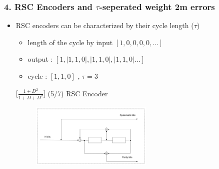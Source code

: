 \documentclass{beamer}  %
\begin{document}
\begin{frame}
\frametitle{4. RSC Encoders and $\tau$-seperated weight 2m errors}
\begin{itemize}
\setlength\itemsep{2em}

\item  RSC encoders can be characterized by their cycle length ($\tau$) 
\begin{itemize}
\item length of the cycle by input $[1, 0, 0, 0, 0,...]$
\end{itemize}

\begin{example} 



\begin{itemize}
 \item output : $[1,|1,1,0|,|1,1,0|,|1,1,0|...]$ 

 \item cycle : $[1,1,0]$ , $\tau = 3$

\end{itemize}
\centering
$\Big[\frac{1+D^2}{1+D+D^2}\Big]$ (5/7)  RSC Encoder
\begin{figure}%
\centering
		\includegraphics[width=0.55\textwidth]{RSCExample3.pdf}
		\label{RSC}
		\end{figure}

\end{example}



\end{itemize}

\end{frame}
\end{document}

